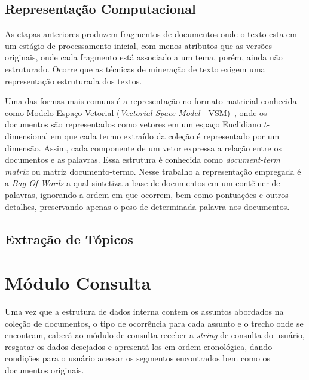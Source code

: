 





\subsection{Representação Computacional}

As etapas anteriores produzem fragmentos de documentos onde o texto esta em um estágio de processamento inicial, com menos atributos que as versões originais, onde cada fragmento está associado a um tema, porém, ainda não estruturado. Ocorre que as técnicas de mineração de texto exigem uma representação estruturada dos textos. %

Uma das formas mais comuns é a representação no formato matricial conhecida como Modelo Espaço Vetorial (\textit{Vectorial Space Model} - VSM)~\cite{Rezende2003}, onde os documentos são representados como vetores em um espaço Euclidiano $t$-dimensional em que cada termo extraído da coleção é representado por um dimensão. Assim, cada componente de um vetor expressa a relação entre os documentos e as palavras. Essa estrutura é conhecida como \textit{document-term matrix} ou matriz documento-termo.  Nesse trabalho a representação empregada é a \textit{Bag Of Words} a qual sintetiza a base de documentos em um contêiner de palavras, ignorando a ordem em que ocorrem, bem como pontuações e outros detalhes, preservando apenas o peso de determinada palavra nos documentos. 



\subsection{Extração de Tópicos}




\section{Módulo Consulta}

Uma vez que a estrutura de dados interna contem os assuntos abordados na coleção de documentos, o tipo de ocorrência para cada assunto e o trecho onde se encontram, caberá ao módulo de consulta receber a \textit{string} de consulta do usuário, resgatar os dados desejados e apresentá-los em ordem cronológica, dando condições para o usuário acessar os segmentos encontrados bem como os documentos originais.


